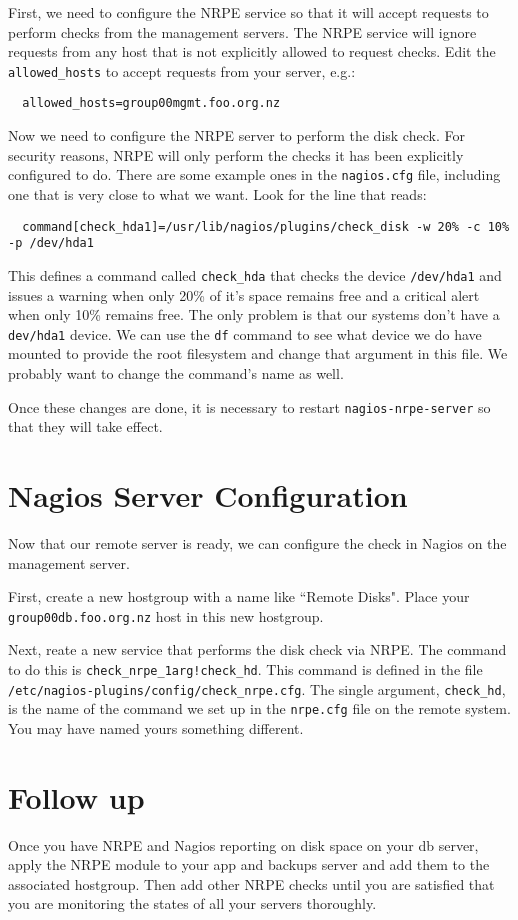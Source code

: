 \documentclass{article}   	%
\begin{document}
First, we need to configure the NRPE service so that it will accept requests to perform checks from the management servers. The NRPE service will ignore requests from any host that is not explicitly allowed to request checks. Edit the \texttt{allowed\_hosts} to accept requests from your server, e.g.:

\begin{verbatim}
  allowed_hosts=group00mgmt.foo.org.nz
\end{verbatim}

Now we need to configure the NRPE server to perform the disk check. For security reasons, NRPE will only perform the checks it has been explicitly configured to do. There are some example ones in the \texttt{nagios.cfg} file, including one that is very close to what we want. Look for the line that reads:

\begin{verbatim}
  command[check_hda1]=/usr/lib/nagios/plugins/check_disk -w 20% -c 10% -p /dev/hda1
\end{verbatim}

This defines a command called \texttt{check\_hda} that checks the device \texttt{/dev/hda1} and issues a warning when only 20\% of it's space remains free and a critical alert when only 10\% remains free. The only problem is that our systems don't have a \texttt{dev/hda1} device. We can use the \texttt{df} command to see what device we do have mounted to provide the root filesystem and change that argument in this file. We probably want to change the command's name as well.

Once these changes are done, it is necessary to restart \texttt{nagios-nrpe-server} so that they will take effect.



\section{Nagios Server Configuration}
Now that our remote server is ready, we can configure the check in Nagios on the management server.

First, create a new hostgroup with a name like ``Remote Disks".  Place your \texttt{group00db.foo.org.nz} host in this new hostgroup.

Next, reate a new service that performs the disk check via NRPE.  The command to do this is \texttt{check\_nrpe\_1arg!check\_hd}.  This command is defined in the file \texttt{/etc/nagios-plugins/config/check\_nrpe.cfg}.  The single argument, \texttt{check\_hd}, is the name of the command we set up in the \texttt{nrpe.cfg} file on the remote system. You may have named yours something different.

\section{Follow up}
Once you have NRPE and Nagios reporting on disk space on your db server, apply the NRPE module to your app and backups server and add them to the associated hostgroup. Then add other NRPE checks until you are satisfied that you are monitoring the states of all your servers thoroughly.
\end{document}
